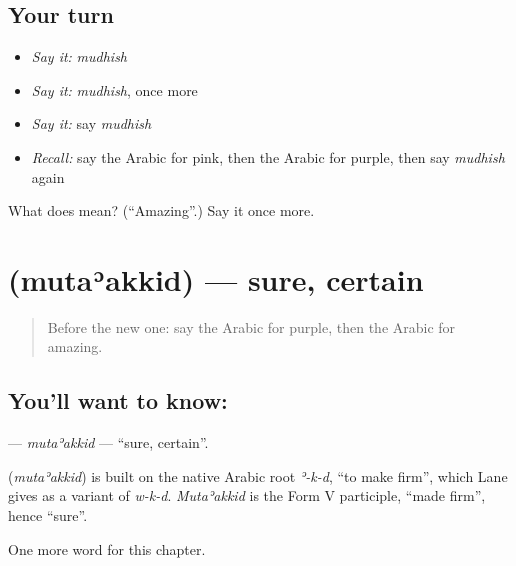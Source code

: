 \subsection*{Your turn}
\begin{itemize}
\raggedright
  \item \emph{Say it:} \emph{mudhish}
  \item \emph{Say it:} \emph{mudhish}, once more
  \item \emph{Say it:} say \emph{mudhish}
  \item \emph{Recall:} say the Arabic for pink, then the Arabic for purple, then say \emph{mudhish} again
\end{itemize}

\begin{tcolorbox}[breakable,colback=teal!4,colframe=teal!35!black,title={Before you move on}]
What does  mean? (\textquotedblleft{}Amazing\textquotedblright{}.) Say it once more.
\end{tcolorbox}
\section[\texorpdfstring{\ar{متأكد} (mutaʾakkid)}{متأكد (mutaʾakkid)}]{ (mutaʾakkid) — sure, certain}

\label{lesson:AR-C272-mutaakkid}



\begin{quote}
Before the new one: say the Arabic for purple, then the Arabic for amazing.
\end{quote}

\subsection*{You'll want to know: }
\textbf{} — \emph{mutaʾakkid} — \textquotedblleft{}sure, certain\textquotedblright{}.

\begin{cousinweb}
\textbf{} (\emph{mutaʾakkid}) is built on the native Arabic root \emph{ʾ-k-d}, \textquotedblleft{}to make firm\textquotedblright{}, which Lane gives as a variant of \emph{w-k-d}. \emph{Mutaʾakkid} is the Form V participle, \textquotedblleft{}made firm\textquotedblright{}, hence \textquotedblleft{}sure\textquotedblright{}.
\end{cousinweb}

\begin{grammarlens}[title={What you've built}]
One more word for this chapter.
\end{grammarlens}

